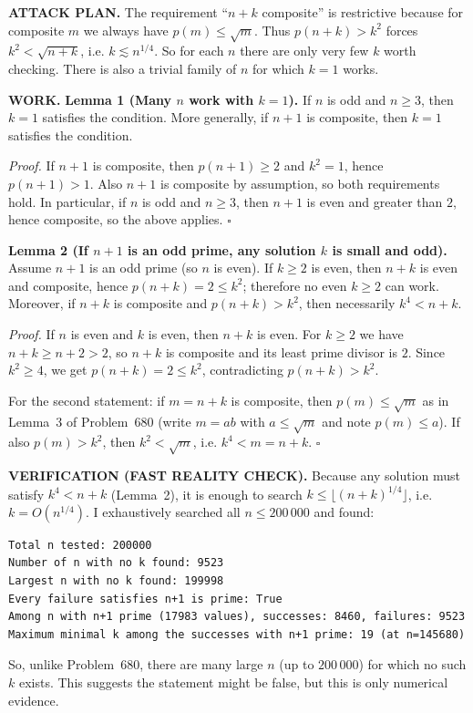 \textbf{ATTACK PLAN.}
The requirement ``$n+k$ composite'' is restrictive because for composite $m$ we always have $p(m)\le\sqrt m$. Thus $p(n+k)>k^{2}$ forces $k^{2}<\sqrt{n+k}$, i.e. $k\lesssim n^{1/4}$. So for each $n$ there are only very few $k$ worth checking. There is also a trivial family of $n$ for which $k=1$ works.

\textbf{WORK.}
\textbf{Lemma 1 (Many $n$ work with $k=1$).}
If $n$ is odd and $n\ge3$, then $k=1$ satisfies the condition.
More generally, if $n+1$ is composite, then $k=1$ satisfies the condition.

\emph{Proof.}
If $n+1$ is composite, then $p(n+1)\ge 2$ and $k^{2}=1$, hence $p(n+1)>1$.
Also $n+1$ is composite by assumption, so both requirements hold.
In particular, if $n$ is odd and $n\ge3$, then $n+1$ is even and greater than $2$, hence composite, so the above applies.
\hfill$\square$

\textbf{Lemma 2 (If $n+1$ is an odd prime, any solution $k$ is small and odd).}
Assume $n+1$ is an odd prime (so $n$ is even). If $k\ge2$ is even, then $n+k$ is even and composite, hence $p(n+k)=2\le k^{2}$; therefore no even $k\ge2$ can work.
Moreover, if $n+k$ is composite and $p(n+k)>k^{2}$, then necessarily $k^{4}<n+k$.

\emph{Proof.}
If $n$ is even and $k$ is even, then $n+k$ is even. For $k\ge2$ we have $n+k\ge n+2>2$, so $n+k$ is composite and its least prime divisor is $2$. Since $k^{2}\ge4$, we get $p(n+k)=2\le k^{2}$, contradicting $p(n+k)>k^{2}$.

For the second statement: if $m=n+k$ is composite, then $p(m)\le \sqrt m$ as in Lemma~3 of Problem~680 (write $m=ab$ with $a\le\sqrt m$ and note $p(m)\le a$). If also $p(m)>k^{2}$, then $k^{2}<\sqrt m$, i.e. $k^{4}<m=n+k$.
\hfill$\square$

\textbf{VERIFICATION (FAST REALITY CHECK).}
Because any solution must satisfy $k^{4}<n+k$ (Lemma~2), it is enough to search $k\le \lfloor (n+k)^{1/4}\rfloor$, i.e. $k=O(n^{1/4})$.
I exhaustively searched all $n\le 200\,000$ and found:
\begin{verbatim}
Total n tested: 200000
Number of n with no k found: 9523
Largest n with no k found: 199998
Every failure satisfies n+1 is prime: True
Among n with n+1 prime (17983 values), successes: 8460, failures: 9523
Maximum minimal k among the successes with n+1 prime: 19 (at n=145680)
\end{verbatim}
So, unlike Problem~680, there are many large $n$ (up to $200\,000$) for which no such $k$ exists.
This suggests the statement might be false, but this is only numerical evidence.

